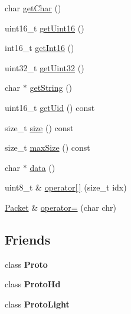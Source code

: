 \begin{DoxyCompactItemize}
char \hyperlink{classTiny_1_1Packet_a260645f9d055da878f149a13ecd58844}{get\+Char} ()
\item 
uint16\+\_\+t \hyperlink{classTiny_1_1Packet_a71765e73adfbc67138f75c2b8ea7d74c}{get\+Uint16} ()
\item 
int16\+\_\+t \hyperlink{classTiny_1_1Packet_a7dfed04418564f93dd4d2b4e9144a861}{get\+Int16} ()
\item 
uint32\+\_\+t \hyperlink{classTiny_1_1Packet_a5dd4b89cb7224b62d4f0328c8e40f38f}{get\+Uint32} ()
\item 
char $\ast$ \hyperlink{classTiny_1_1Packet_a8bc9a3b3f41be292f9c5ac566afeb04b}{get\+String} ()
\item 
uint16\+\_\+t \hyperlink{classTiny_1_1Packet_a65e342e15b9fa3e878393d268c4e69e4}{get\+Uid} () const
\item 
size\+\_\+t \hyperlink{classTiny_1_1Packet_a47c24d500159d2268908b10c407d8d4d}{size} () const
\item 
size\+\_\+t \hyperlink{classTiny_1_1Packet_a9985ff3b48f81628a7428b1197ca9f8f}{max\+Size} () const
\item 
char $\ast$ \hyperlink{classTiny_1_1Packet_a3307ba504caba9c5eee8f1f32cf1a749}{data} ()
\item 
uint8\+\_\+t \& \hyperlink{classTiny_1_1Packet_abfaef504eb88a4db88bca3b907770fa2}{operator\mbox{[}$\,$\mbox{]}} (size\+\_\+t idx)
\item 
\hyperlink{classTiny_1_1Packet}{Packet} \& \hyperlink{classTiny_1_1Packet_a2de2c7f2c3ea6baaab462dd7e4469ecb}{operator=} (char chr)
\end{DoxyCompactItemize}
\subsection*{Friends}
\begin{DoxyCompactItemize}
\item 
\mbox{\label{classTiny_1_1Packet_a45bd055fddab40aaf0c60bfb9e21aa6f}} 
class {\bfseries Proto}
\item 
\mbox{\label{classTiny_1_1Packet_a7f90e063a34c3417ed1ea25e64608857}} 
class {\bfseries Proto\+Hd}
\item 
\mbox{\label{classTiny_1_1Packet_a1d317236f2a79fa559d5a9112e555882}} 
class {\bfseries Proto\+Light}
\end{DoxyCompactItemize}


